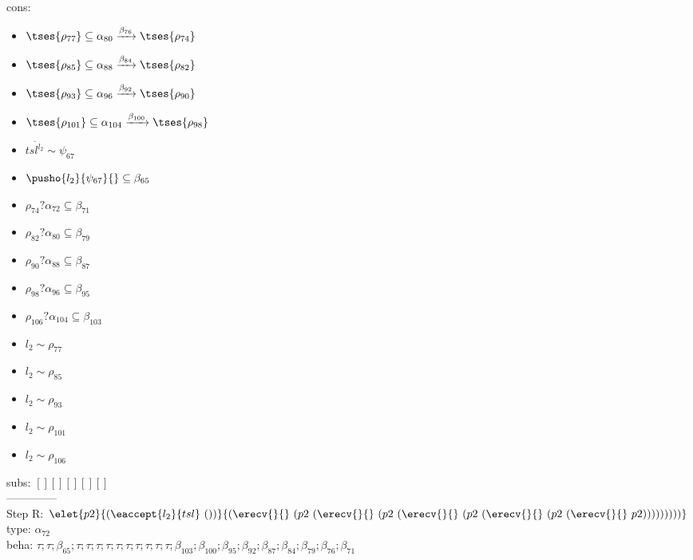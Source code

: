 \documentclass[12pt]{article}
\begin{document}
 \\ cons: \begin{itemize}
\item $  \tses{ \rho_{77}} \subseteq \alpha_{80} \xrightarrow{\beta_{76}}  \tses{ \rho_{74}} $
\item $  \tses{ \rho_{85}} \subseteq \alpha_{88} \xrightarrow{\beta_{84}}  \tses{ \rho_{82}} $
\item $  \tses{ \rho_{93}} \subseteq \alpha_{96} \xrightarrow{\beta_{92}}  \tses{ \rho_{90}} $
\item $  \tses{ \rho_{101}} \subseteq \alpha_{104} \xrightarrow{\beta_{100}}  \tses{ \rho_{98}} $
\item $ \overline{{tsl}^{l_{2}}} \sim\psi_{67} $
\item $ \pusho{ l_{2}} {\psi_{67}}{} \subseteq \beta_{65} $
\item $ \rho_{74}?\alpha_{72} \subseteq \beta_{71} $
\item $ \rho_{82}?\alpha_{80} \subseteq \beta_{79} $
\item $ \rho_{90}?\alpha_{88} \subseteq \beta_{87} $
\item $ \rho_{98}?\alpha_{96} \subseteq \beta_{95} $
\item $ \rho_{106}?\alpha_{104} \subseteq \beta_{103} $
\item $ l_{2} \sim\rho_{77} $
\item $ l_{2} \sim\rho_{85} $
\item $ l_{2} \sim\rho_{93} $
\item $ l_{2} \sim\rho_{101} $
\item $ l_{2} \sim\rho_{106} $
\end{itemize}
 subs:  $ [ ] [] [] [] [] $ 
  \\--------------\\ 
Step R: $ \elet{p2}{(\eaccept{ l_{2} }{tsl}~())}{(\erecv{}{}~(p2~(\erecv{}{}~(p2~(\erecv{}{}~(p2~(\erecv{}{}~(p2~(\erecv{}{}~p2)))))))))} $\\
  type: $ \alpha_{72} $ 
\\  beha: $ \tau; \tau; \beta_{65}; \tau; \tau; \tau; \tau; \tau; \tau; \tau; \tau; \tau; \tau; \beta_{103}; \beta_{100}; \beta_{95}; \beta_{92}; \beta_{87}; \beta_{84}; \beta_{79}; \beta_{76}; \beta_{71} $ 
\end{document}
